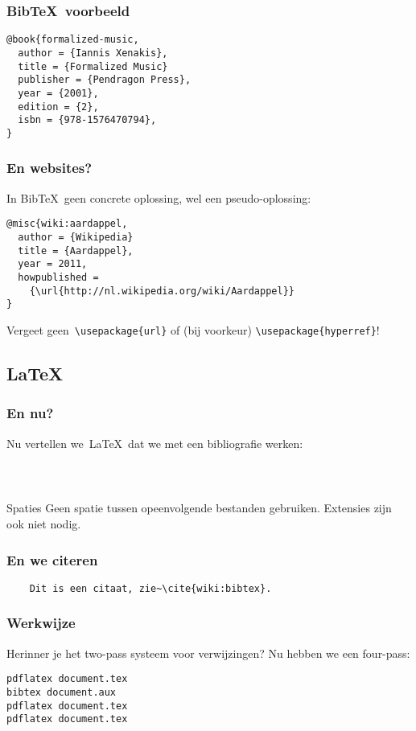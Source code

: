 \begin{frame}[fragile]
  \frametitle{Bib\TeX\ voorbeeld}

  \begin{verbatim}
@book{formalized-music,
  author = {Iannis Xenakis},
  title = {Formalized Music}
  publisher = {Pendragon Press},
  year = {2001},
  edition = {2},
  isbn = {978-1576470794},
}
  \end{verbatim}
\end{frame}

\begin{frame}[fragile]
  \frametitle{En websites?}

  In Bib\TeX\ geen concrete oplossing, wel een pseudo-oplossing:
  \begin{verbatim}
@misc{wiki:aardappel,
  author = {Wikipedia}
  title = {Aardappel},
  year = 2011,
  howpublished =
    {\url{http://nl.wikipedia.org/wiki/Aardappel}}
}
  \end{verbatim}
  Vergeet geen~\texttt{\textcolor{uagreen}{\textbackslash usepackage}\{url\}} of (bij voorkeur) \texttt{\textcolor{uagreen}{\textbackslash usepackage}\{hyperref\}}!
\end{frame}

\subsection{\LaTeX}
\begin{frame}[fragile]
  \frametitle{En nu?}

  Nu vertellen we~\LaTeX\ dat we met een bibliografie werken:
  \begin{verbatim}



  \end{verbatim}
  \begin{alertblock}{Spaties}
	Geen spatie tussen opeenvolgende bestanden gebruiken. Extensies zijn ook niet nodig.
  \end{alertblock}
\end{frame}

\begin{frame}[fragile]
  \frametitle{En we citeren}

  \begin{verbatim}
	Dit is een citaat, zie~\cite{wiki:bibtex}.
  \end{verbatim}
\end{frame}

\begin{frame}[fragile]
  \frametitle{Werkwijze}

  Herinner je het two-pass systeem voor verwijzingen? Nu hebben we een four-pass:
  \begin{verbatim}
pdflatex document.tex
bibtex document.aux
pdflatex document.tex
pdflatex document.tex\end{verbatim}
\end{frame}

